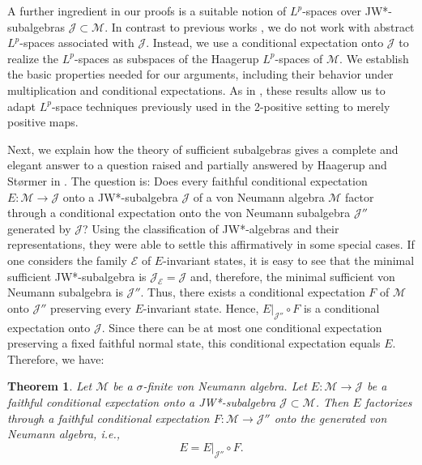 \documentclass[12pt]{article}
\def\Me{\mathcal M}
\def\Ee{\mathcal E}
\def\Je{\mathcal J}
\newtheorem{introtheorem}{Theorem} %
\theoremstyle{definition}
\theoremstyle{remark}
\begin{document}
A further ingredient in our proofs is a suitable notion of $L^p$-spaces over JW*-subalgebras $\Je\subset \Me$. 
In contrast to previous works
\cite{ayupov1984integration,arhancet_spectral_2026,arhancet_completely_2026,arhancet_positive_2023},
we do not work with abstract $L^p$-spaces associated with $\Je$. 
Instead, we use a conditional expectation onto $\Je$ to realize the $L^p$-spaces as subspaces of the Haagerup $L^p$-spaces of $\Me$.
We establish the basic properties needed for our arguments, including their behavior under multiplication and conditional expectations. 
As in \cite{luijk2026sufficiency}, these results allow us to adapt $L^p$-space techniques
previously used in the 2-positive setting \cite{hiai2024alphaz,jencova2018renyi,jencova2021renyi} to merely positive maps.

Next, we explain how the theory of sufficient subalgebras gives a complete and elegant answer to a question raised and partially answered by Haagerup and Størmer in \cite{stormer_positive_1963}.
The question is: 
Does every faithful conditional expectation $E: \Me \to \Je$ onto a JW*-subalgebra $\Je$ of a von Neumann algebra $\Me$ factor through a conditional expectation onto the von Neumann subalgebra $\Je''$ generated by $\Je$?
Using the classification of JW*-algebras and their representations, they were able to settle this affirmatively in some special cases.
If one considers the family $\Ee$ of $E$-invariant states, it is easy to see that the minimal sufficient JW*-subalgebra is $\Je_\Ee=\Je$ and, therefore, the minimal sufficient von Neumann subalgebra is $\Je''$.
Thus, there exists a conditional expectation $F$ of $\Me$ onto $\Je''$ preserving every $E$-invariant state.
Hence, $E|_{\Je''} \circ F$ is a conditional expectation onto $\Je$.
Since there can be at most one conditional expectation preserving a fixed faithful normal state, this conditional expectation equals $E$.
Therefore, we have:

\begin{introtheorem}\label{introthm:CE}
    Let $\Me$ be a $\sigma$-finite von Neumann algebra.
    Let $E: \Me \to \Je$ be a faithful conditional expectation onto a JW*-subalgebra $\Je \subset \Me$.
    Then $E$ factorizes through a faithful conditional expectation $F: \Me \to \Je''$ onto the generated von Neumann algebra, i.e.,
    \begin{equation}
        E = E|_{\Je''} \circ F.
    \end{equation}
\end{introtheorem}
\end{document}
